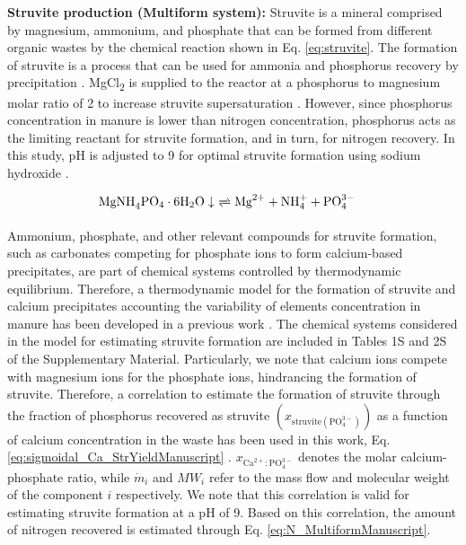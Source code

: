 \begin{refsection}[referencesCh6]
\textbf{Struvite production (Multiform system):} Struvite is a mineral comprised by magnesium, ammonium, and phosphate that can be formed from different  organic wastes by the chemical reaction shown in Eq. \ref{eq:struvite}. The formation of struvite is a process that can be used for ammonia and phosphorus recovery by precipitation \citep{martin2020m}. MgCl\textsubscript{2} is supplied to the reactor at a phosphorus to magnesium molar ratio of 2 to increase struvite supersaturation \citep{bhuiyan2008phosphorus}. However, since phosphorus concentration in manure is lower than nitrogen concentration, phosphorus acts as the limiting reactant for struvite formation, and in turn, for nitrogen recovery. In this study, pH is adjusted to 9 for optimal struvite formation using sodium hydroxide \citep{Tao}.

\begin{align}
	& \text{MgNH}_{4}\text{PO}_{4} \cdot 6\text{H}_{2}\text{O} \downarrow \ \xrightleftharpoons[]{} \text{Mg}^{2+} + \text{NH}_{4}^{+} + \text{PO}_{4}^{3-} \label{eq:struvite}
\end{align}

Ammonium, phosphate, and other relevant compounds for struvite formation, such as carbonates competing for phosphate ions to form calcium-based precipitates, are part of chemical systems controlled by thermodynamic equilibrium. Therefore, a thermodynamic model for the formation of struvite and calcium precipitates accounting the variability of elements concentration in manure has been developed in a previous work \citep{martin2020m}.
The chemical systems considered in the model for estimating struvite formation are included
in Tables 1S and 2S of the Supplementary Material.
Particularly, we note that calcium ions compete with magnesium ions for the phosphate ions, hindrancing the formation of struvite. Therefore, a correlation
to estimate the formation of struvite through the fraction of phosphorus recovered as struvite $\left(x_{\text{struvite} \left(\text{PO}_{4}^{3-}\right) }\right) $ as a function of calcium concentration in the waste has been used in this work, Eq. \ref{eq:sigmoidal_Ca_StrYieldManuscript} \citep{martin2020m}. $x_{\text{Ca}^{2+}:\text{PO}_{4}^{3-}}$ denotes the molar calcium-phosphate ratio, while $\dot{m}_{i}$ and $MW_i$ refer to the mass flow and molecular weight of the component $i$ respectively. We note that this correlation is valid for estimating struvite formation at a pH of 9.
Based on this correlation,
the amount of nitrogen recovered is estimated through Eq. \ref{eq:N_MultiformManuscript}.


\end{refsection}
